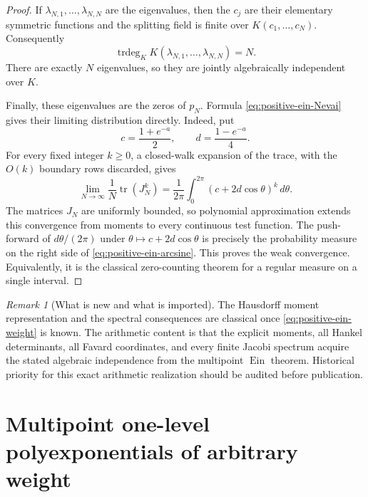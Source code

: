 \documentclass[11pt]{article}
\theoremstyle{definition}
\theoremstyle{remark}
\newtheorem{remark}[theorem]{Remark}
\newcommand{\Ein}{\operatorname{Ein}}
\newcommand{\EinDepth}[1]{\operatorname{Ein}_{#1}}
\newcommand{\Eexp}{\mathcal E_{\mathrm{exp}}}
\begin{document}
\begin{proof}
If $\lambda_{N,1},\ldots,\lambda_{N,N}$ are the eigenvalues, then the
$c_j$ are their elementary symmetric functions and the splitting field
is finite over $K(c_1,\ldots,c_N)$.  Consequently
\[
 \operatorname{trdeg}_K
 K(\lambda_{N,1},\ldots,\lambda_{N,N})=N.
\]
There are exactly $N$ eigenvalues, so they are jointly algebraically
independent over $K$.

Finally, these eigenvalues are the zeros of $p_N$.  Formula
\eqref{eq:positive-ein-Nevai} gives their limiting distribution directly.
Indeed, put
\[
 c=\frac{1+e^{-a}}2,
 \qquad d=\frac{1-e^{-a}}4.
\]
For every fixed integer $k\geq0$, a closed-walk expansion of the trace,
with the $O(k)$ boundary rows discarded, gives
\[
 \lim_{N\to\infty}\frac1N\operatorname{tr}(J_N^k)
 =\frac1{2\pi}\int_0^{2\pi}(c+2d\cos\theta)^k\,d\theta.
\]
The matrices $J_N$ are uniformly bounded, so polynomial approximation
extends this convergence from moments to every continuous test function.
The push-forward of $d\theta/(2\pi)$ under
$\theta\mapsto c+2d\cos\theta$ is precisely the probability measure on
the right side of \eqref{eq:positive-ein-arcsine}.  This proves the weak
convergence.  Equivalently, it is the classical zero-counting theorem for
a regular measure on a single interval.
\end{proof}

\begin{remark}[What is new and what is imported]
The Hausdorff moment representation and the spectral consequences are
classical once \eqref{eq:positive-ein-weight} is known.  The arithmetic
content is that the explicit moments, all Hankel determinants, all
Favard coordinates, and every finite Jacobi spectrum acquire the stated
algebraic independence from the multipoint $\Ein$ theorem.  Historical
priority for this exact arithmetic realization should be audited before
publication.
\end{remark}

\providecommand{\EinDepth}[1]{\operatorname{Ein}_{#1}}
\providecommand{\Eexp}{\mathcal E_{\mathrm{exp}}}

\section{Multipoint one-level polyexponentials of arbitrary weight}
\label{sec:ein-depth-tower}
\end{document}
